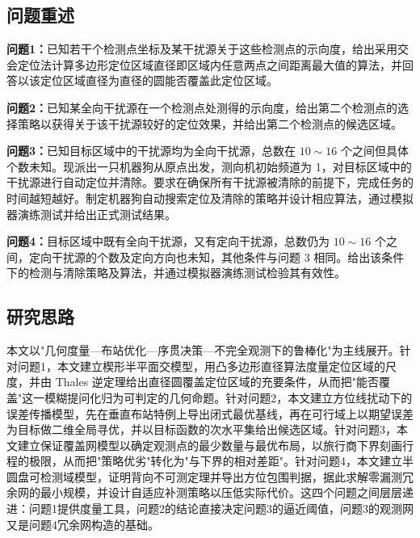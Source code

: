 \subsection{问题重述}

\textbf{问题1：}已知若干个检测点坐标及某干扰源关于这些检测点的示向度，给出采用交会定位法计算多边形定位区域直径即区域内任意两点之间距离最大值的算法，并回答以该定位区域直径为直径的圆能否覆盖此定位区域。

\textbf{问题2：}已知某全向干扰源在一个检测点处测得的示向度，给出第二个检测点的选择策略以获得关于该干扰源较好的定位效果，并给出第二个检测点的候选区域。

\textbf{问题3：}已知目标区域中的干扰源均为全向干扰源，总数在 $10\sim16$ 个之间但具体个数未知。现派出一只机器狗从原点出发，测向机初始频道为 1，对目标区域中的干扰源进行自动定位并清除。要求在确保所有干扰源被清除的前提下，完成任务的时间越短越好。制定机器狗自动搜索定位及清除的策略并设计相应算法，通过模拟器演练测试并给出正式测试结果。

\textbf{问题4：}目标区域中既有全向干扰源，又有定向干扰源，总数仍为 $10\sim16$ 个之间，定向干扰源的个数及定向方向也未知，其他条件与问题 3 相同。给出该条件下的检测与清除策略及算法，并通过模拟器演练测试检验其有效性。

\subsection{研究思路}

本文以"几何度量—布站优化—序贯决策—不完全观测下的鲁棒化"为主线展开。针对问题1，本文建立楔形半平面交模型，用凸多边形直径算法度量定位区域的尺度，并由 Thales 逆定理给出直径圆覆盖定位区域的充要条件，从而把"能否覆盖"这一模糊提问化归为可判定的几何命题。针对问题2，本文建立方位线扰动下的误差传播模型，先在垂直布站特例上导出闭式最优基线，再在可行域上以期望误差为目标做二维全局寻优，并以目标函数的次水平集给出候选区域。针对问题3，本文建立保证覆盖网模型以确定观测点的最少数量与最优布局，以旅行商下界刻画行程的极限，从而把"策略优劣"转化为"与下界的相对差距"。针对问题4，本文建立半圆盘可检测域模型，证明背向不可测定理并导出方位包围判据，据此求解零漏测冗余网的最小规模，并设计自适应补测策略以压低实际代价。这四个问题之间层层递进：问题1提供度量工具，问题2的结论直接决定问题3的逼近阈值，问题3的观测网又是问题4冗余网构造的基础。
